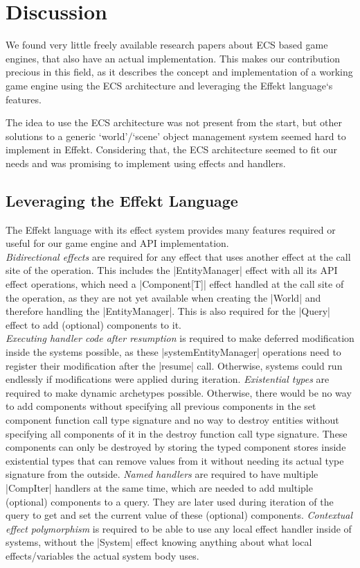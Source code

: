 \chapter{Discussion}\label{chap:discussion}

We found very little freely available research papers about ECS based game engines, that also have an actual implementation. This makes our contribution precious in this field, as it describes the concept and implementation of a working game engine using the ECS architecture and leveraging the Effekt language`s features.

The idea to use the ECS architecture was not present from the start, but other solutions to a generic `world'/`scene' object management system seemed hard to implement in Effekt. Considering that, the ECS architecture seemed to fit our needs and was promising to implement using effects and handlers.

\section{Leveraging the Effekt Language}

The Effekt language with its effect system provides many features required or useful for our game engine and API implementation.\\
\textit{Bidirectional effects} are required for any effect that uses another effect at the call site of the operation. This includes the |EntityManager| effect with all its API effect operations, which need a |Component[T]| effect handled at the call site of the operation, as they are not yet available when creating the |World| and therefore handling the |EntityManager|. This is also required for the |Query| effect to add (optional) components to it.\\
\textit{Executing handler code after resumption} is required to make deferred modification inside the systems possible, as these |systemEntityManager| operations need to register their modification after the |resume| call. Otherwise, systems could run endlessly if modifications were applied during iteration.
\textit{Existential types} are required to make dynamic archetypes possible. Otherwise, there would be no way to add components without specifying all previous components in the set component function call type signature and no way to destroy entities without specifying all components of it in the destroy function call type signature. These components can only be destroyed by storing the typed component stores inside existential types that can remove values from it without needing its actual type signature from the outside.
\textit{Named handlers} are required to have multiple |CompIter| handlers at the same time, which are needed to add multiple (optional) components to a query. They are later used during iteration of the query to get and set the current value of these (optional) components.
\textit{Contextual effect polymorphism} is required to be able to use any local effect handler inside of systems, without the |System| effect knowing anything about what local effects/variables the actual system body uses.

